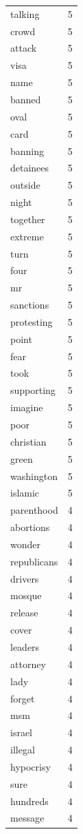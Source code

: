 \begin{tabular}{lr}
talking & 5 \\
crowd & 5 \\
attack & 5 \\
visa & 5 \\
name & 5 \\
banned & 5 \\
oval & 5 \\
card & 5 \\
banning & 5 \\
detainees & 5 \\
outside & 5 \\
night & 5 \\
together & 5 \\
extreme & 5 \\
turn & 5 \\
four & 5 \\
mr & 5 \\
sanctions & 5 \\
protesting & 5 \\
point & 5 \\
fear & 5 \\
took & 5 \\
supporting & 5 \\
imagine & 5 \\
poor & 5 \\
christian & 5 \\
green & 5 \\
washington & 5 \\
islamic & 5 \\
parenthood & 4 \\
abortions & 4 \\
wonder & 4 \\
republicans & 4 \\
drivers & 4 \\
mosque & 4 \\
release & 4 \\
cover & 4 \\
leaders & 4 \\
attorney & 4 \\
lady & 4 \\
forget & 4 \\
msm & 4 \\
israel & 4 \\
illegal & 4 \\
hypocrisy & 4 \\
sure & 4 \\
hundreds & 4 \\
message & 4 \\

\end{tabular}
